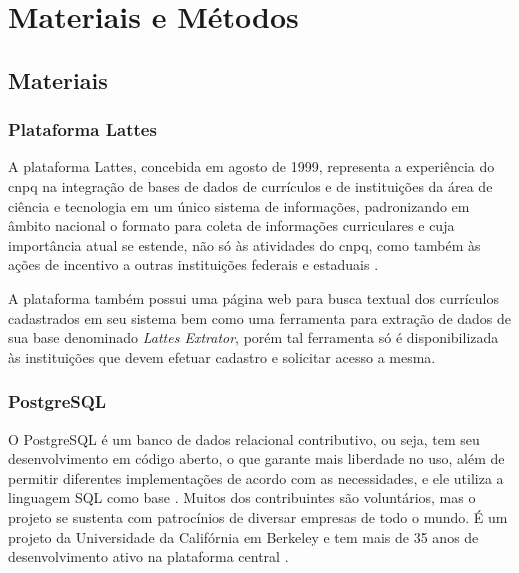 \chapter{Materiais e Métodos}\label{cap:materialemetodos}

\section{Materiais}\label{sec:materiais}

\subsection{Plataforma Lattes}\label{subsec:lattes}

A plataforma Lattes, concebida em agosto de 1999, representa a experiência do \gls{cnpq} na integração de bases de dados de currículos e de instituições da área de ciência e tecnologia em um único sistema de informações, padronizando em âmbito nacional o formato para coleta de informações curriculares e cuja importância atual se estende, não só às atividades do \gls{cnpq}, como também às ações de incentivo a outras instituições federais e estaduais \cite{Lattes}.

A plataforma também possui uma página web para busca textual dos currículos cadastrados em seu sistema bem como uma ferramenta para extração de dados de sua base denominado \textit{Lattes Extrator}, porém tal ferramenta só é disponibilizada às instituições que devem efetuar cadastro e solicitar acesso a mesma.

\subsection{PostgreSQL}\label{subsec:postgresql}

O PostgreSQL é um banco de dados relacional contributivo, ou seja, tem seu desenvolvimento em código aberto, o que garante mais liberdade no uso, além de permitir diferentes implementações de acordo com as necessidades, e ele utiliza a linguagem SQL como base \cite{Amazon}. Muitos dos contribuintes são voluntários, mas o projeto se sustenta com patrocínios de diversar empresas de todo o mundo. É um projeto da Universidade da Califórnia em Berkeley e tem mais de 35 anos de desenvolvimento ativo na plataforma central \cite{PostgreSQL}.

